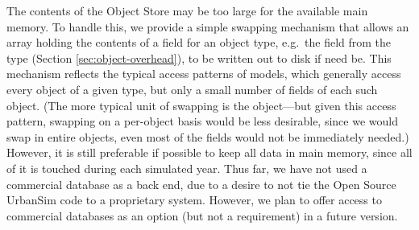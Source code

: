 The contents of the Object Store may be too large for the
available main memory.  To handle this, we provide a simple
swapping mechanism that allows an array holding the contents of a
field for an object type, e.g.\ the  field from
the  type (Section \ref{sec:object-overhead}), to
be written out to disk if need be.  This mechanism reflects the
typical access patterns of models, which generally access every
object of a given type, but only a small number of fields of each
such object.  (The more typical unit of swapping is the
object---but given this access pattern, swapping on a per-object
basis would be less desirable, since we would swap in entire
objects, even most of the fields would not be immediately needed.)
However, it is still preferable if possible to keep all data in
main memory, since all of it is touched during each simulated
year.  Thus far, we have not used a commercial database as a back
end, due to a desire to not tie the Open Source UrbanSim code to a
proprietary system. However, we plan to offer access to commercial
databases as an option (but not a requirement) in a future
version.
